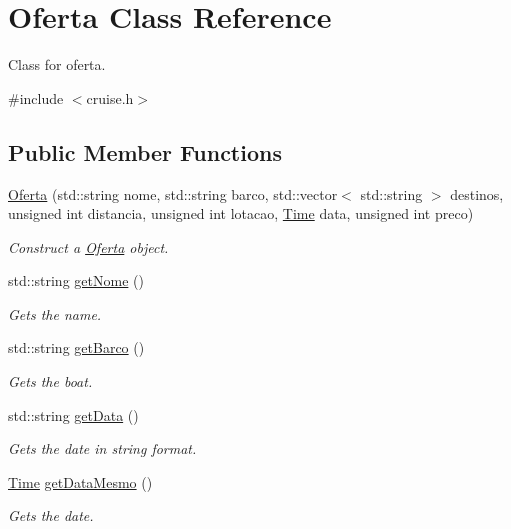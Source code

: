 \hypertarget{classOferta}{}\section{Oferta Class Reference}
\label{classOferta}


Class for oferta.  




{\ttfamily \#include $<$cruise.\+h$>$}

\subsection*{Public Member Functions}
\begin{DoxyCompactItemize}
\item 
\hyperlink{classOferta_a49a53f9d6ba51f97a3b428c8fac98d7f}{Oferta} (std\+::string nome, std\+::string barco, std\+::vector$<$ std\+::string $>$ destinos, unsigned int distancia, unsigned int lotacao, \hyperlink{classTime}{Time} data, unsigned int preco)
\begin{DoxyCompactList}\small\item\em Construct a \hyperlink{classOferta}{Oferta} object. \end{DoxyCompactList}\item 
std\+::string \hyperlink{classOferta_a16da38d9f369b000cb544c34200707b8}{get\+Nome} ()
\begin{DoxyCompactList}\small\item\em Gets the name. \end{DoxyCompactList}\item 
std\+::string \hyperlink{classOferta_aaed9b5937f9f33d2980fcc13ac02132c}{get\+Barco} ()
\begin{DoxyCompactList}\small\item\em Gets the boat. \end{DoxyCompactList}\item 
std\+::string \hyperlink{classOferta_a2b156b75371ad59af54ad96ad79c9d1e}{get\+Data} ()
\begin{DoxyCompactList}\small\item\em Gets the date in string format. \end{DoxyCompactList}\item 
\hyperlink{classTime}{Time} \hyperlink{classOferta_a13ebfcae88d39a90f0c66368534ed335}{get\+Data\+Mesmo} ()
\begin{DoxyCompactList}\small\item\em Gets the date. \end{DoxyCompactList}\item 

\end{DoxyCompactItemize}
